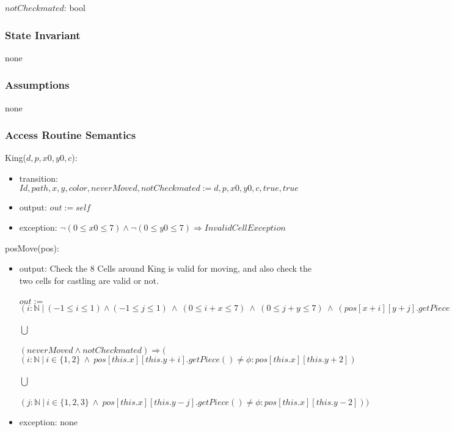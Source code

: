 \documentclass[12pt]{article}
\begin{document}
$notCheckmated$: bool

\subsubsection* {State Invariant}

none

\subsubsection* {Assumptions}

none

\subsubsection* {Access Routine Semantics}

King($d, p, x0, y0, c$):
\begin{itemize}
\item transition: $Id, path, x, y, color, neverMoved, notCheckmated := d, p, x0, y0, c, true, true$
\item output: $out := \mathit{self}$
\item exception: $ \neg (0 \leq x0 \leq 7) \wedge  \neg (0 \leq y0 \leq 7) \Rightarrow InvalidCellException$
\end{itemize}

\noindent posMove(pos):
\begin{itemize}
\item output: Check the 8 Cells around King is valid for moving, and also check the two cells for castling are valid or not.\\
\\
$out :=$\\
$(i : \mathbb{N} \ | \ (-1 \leq i \leq 1) \wedge (-1 \leq j \leq 1)\ \wedge \ (0 \leq i + x \leq 7) \ \wedge \ (0 \leq j+y \leq 7) \ \wedge \ (pos[x+i][y+j].getPiece() = \phi \vee pos[x+i][y+j].getPiece().getColor() \ne this.getColor()) : pos[x+i][y+j]) $ \\
\\
$\bigcup$\\
\\
$(neverMoved \wedge notCheckmated) \Rightarrow ($\\
$(i : \mathbb{N} \ | \ i \in \{1,2\} \  \wedge \ pos[this.x][this.y + i].getPiece() \ne \phi : pos[this.x][this.y + 2])$\\
\\
$\bigcup$\\
\\
$(j : \mathbb{N} \ | \ i \in \{1,2,3\} \  \wedge \ pos[this.x][this.y - j].getPiece() \ne \phi : pos[this.x][this.y - 2]))$\\
\item exception: none
\end{itemize}
\end{document}

